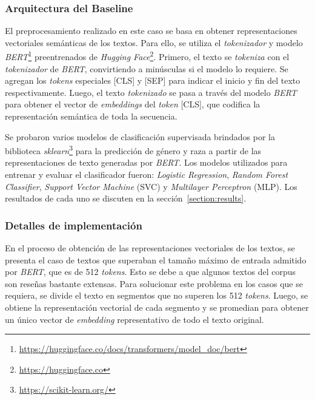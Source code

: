 \subsubsection{Arquitectura del Baseline}
El preprocesamiento realizado en este caso se basa en obtener representaciones vectoriales sem\'anticas 
de los textos. Para ello, se utiliza el \emph{tokenizador} y modelo 
\emph{BERT}\footnote{\url{https://huggingface.co/docs/transformers/model_doc/bert}} preentrenados de 
\emph{Hugging Face}\footnote{\url{https://huggingface.co}}. Primero, el texto se \emph{tokeniza} con el 
\emph{tokenizador} de \emph{BERT}, convirtiendo a min\'usculas si el modelo lo requiere. Se agregan los 
\emph{tokens} especiales [CLS] y [SEP] para indicar el inicio y fin del texto respectivamente.
Luego, el texto \emph{tokenizado} se pasa a trav\'es del modelo \emph{BERT} para obtener el vector de 
\emph{embeddings} del \emph{token} [CLS], que codifica la representaci\'on sem\'antica de toda la secuencia. 

Se probaron varios modelos de clasificaci\'on supervisada brindados por la biblioteca 
\emph{sklearn}\footnote{\url{https://scikit-learn.org/}} para la predicci\'on de g\'enero y raza 
a partir de las representaciones de texto generadas por \emph{BERT}. Los modelos utilizados para 
entrenar y evaluar el clasificador fueron: \emph{Logistic Regression}, 
\emph{Random Forest Classifier}, \emph{Support Vector Machine} (SVC) y \emph{Multilayer Perceptron} (MLP).
Los resultados de cada uno se discuten en la secci\'on~\ref{section:results}.

\subsubsection{Detalles de implementaci\'on}

En el proceso de obtenci\'on de las representaciones vectoriales de los textos, se presenta el caso
de textos que superaban el tama\~no m\'aximo de entrada admitido por \emph{BERT}, que es de 512 \emph{tokens}.
Esto se debe a que algunos textos del corpus son rese\~nas bastante extensas. Para solucionar este problema en 
los casos que se requiera, se divide el texto en segmentos que no superen los 512 \emph{tokens}. Luego, se obtiene
la representaci\'on vectorial de cada segmento y se promedian para obtener un \'unico vector de \emph{embedding}
representativo de todo el texto original.

